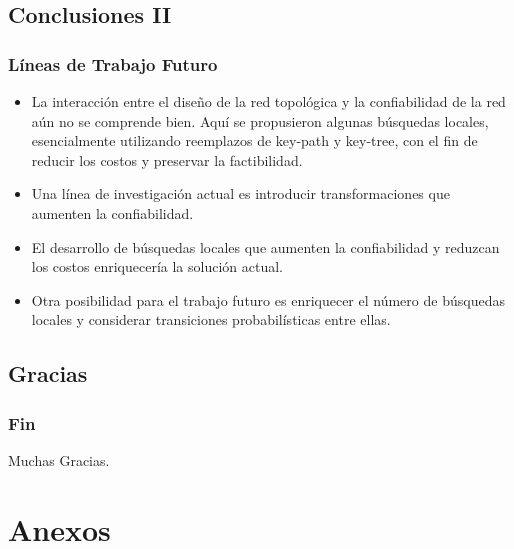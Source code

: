 \subsection{Conclusiones II}
\begin{frame} \frametitle{Líneas de Trabajo Futuro}
\begin{block} {}
   	\begin{scriptsize}
 	 \begin{itemize}
 	 	\item La interacción entre el diseño de la red topológica y la confiabilidad de la red aún no se comprende bien. Aquí se propusieron algunas búsquedas locales, esencialmente utilizando reemplazos de key-path y key-tree, con el fin de reducir los costos y preservar la factibilidad.
 	 	\item Una línea de investigación actual es introducir transformaciones que aumenten la confiabilidad. 
 	 	\item El desarrollo de búsquedas locales que aumenten la confiabilidad y reduzcan los costos enriquecería la solución actual.
 	 	\item Otra posibilidad para el trabajo futuro es enriquecer el número de búsquedas locales y considerar transiciones probabilísticas entre ellas.
 	 \end{itemize}  
 	\end{scriptsize}
 \end{block} 	   
\end{frame}

\subsection{Gracias}
\begin{frame} \frametitle{Fin}
\begin{huge}
Muchas Gracias.
\end{huge}
\end{frame}

\section{Anexos}
